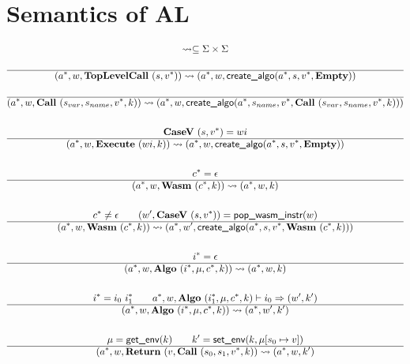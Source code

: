 \section{Semantics of AL}
\label{semantics}


\begin{gather*}
\leadsto \subseteq \Sigma \times \Sigma \\
%
\newline \\
  \hline
  (\seq{a}, w, \toplevelcall ~ (s, \seq v)) \leadsto (\seq{a}, w, \createalgo(\seq a, s, \seq v, \mt)) \\
%
\newline \\
  \hline
  (\seq{a}, w, \call ~ (s_{var}, s_{name}, \seq v, k)) \leadsto
  (\seq{a}, w, \createalgo(\seq a, s_{name}, \seq v, \call ~ (s_{var}, s_{name}, \seq v, k))) \\
%
\newline \\
  \casev ~ (s, \seq v) = wi \\
  \hline
  (\seq{a}, w, \exe ~ (wi, k)) \leadsto (\seq{a}, w, \createalgo(\seq a, s, \seq v, \mt)) \\
%
\newline \\
  \seq c = \epsilon \\
  \hline
  (\seq{a}, w, \wasm ~ (\seq c, k)) \leadsto (\seq{a}, w, k) \\
%
\newline \\
  \seq c \not= \epsilon \qquad
  (w', \casev ~ (s, \seq v)) = \popwasminstr(w) \\
  \hline
  (\seq{a}, w, \wasm ~ (\seq c, k))
  \leadsto
  (\seq{a}, w', \createalgo(\seq a, s, \seq v, \wasm ~ (\seq c, k))) \\
%
\newline \\
  \seq i = \epsilon \\
  \hline
  (\seq{a}, w, \algo ~ (\seq i, \mu, \seq c, k)) \leadsto (\seq{a}, w, k) \\
%
\newline \\
  \seq i = i_0 ~ \seq{i_1} \qquad \seq{a}, w, \algo ~ (\seq{i_1}, \mu, \seq c, k) \vdash i_0 \Rightarrow (w', k') \\
  \hline
  (\seq{a}, w, \algo ~ (\seq i, \mu, \seq c, k)) \leadsto (\seq{a}, w', k') \\
%
\newline \\
  \mu = \getenv(k) \qquad k' = \setenv(k, \mu[s_0 \mapsto v]) \\
  \hline
  (\seq{a}, w, \ret ~ (v, \call ~ (s_0, s_1, \seq v, k)) \leadsto (\seq a, w, k') \\
\end{gather*}

